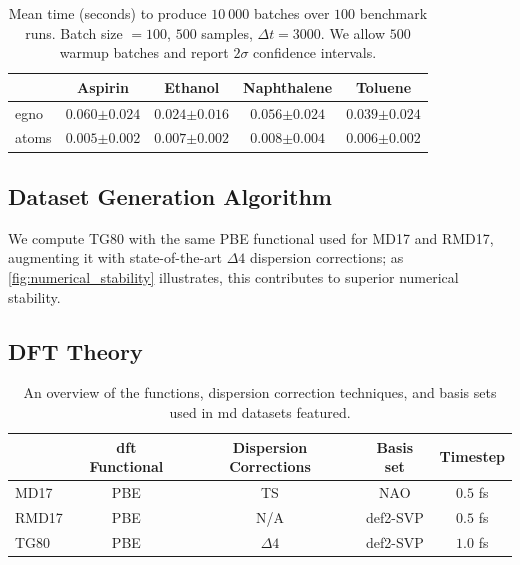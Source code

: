 \begin{table}[ht]
    \centering
    \caption{Mean time (seconds) to produce \(10\ 000\) batches over \(100\) benchmark runs. Batch size \(= 100\), \(500\) samples, \(\Delta t = 3000\). We allow \(500\) warmup batches and report \(2\sigma\) confidence intervals.}
    \label{tab:dataloader_perf}
    \begin{tabular}{lcccc}
        \toprule
         & Aspirin & Ethanol & Naphthalene & Toluene \\
         \midrule
         \gls{egno} & \(0.060{\scriptstyle \pm0.024}\) & \(0.024{\scriptstyle \pm0.016}\) & \(0.056{\scriptstyle \pm0.024}\) & \(0.039{\scriptstyle \pm0.024}\) \\
         \gls{atoms} & \(0.005{\scriptstyle \pm0.002}\) & \(0.007{\scriptstyle \pm0.002}\) & \(0.008{\scriptstyle \pm0.004}\) & \(0.006{\scriptstyle \pm0.002}\) \\
         \bottomrule
    \end{tabular}
\end{table}

\subsection{Dataset Generation Algorithm}
We compute TG80 with the same PBE functional used for MD17 and RMD17, augmenting it with state-of-the-art \(\Delta 4\) dispersion corrections; as \cref{fig:numerical_stability} illustrates, this contributes to superior numerical stability.

\subsection{DFT Theory}
\begin{table}[H]
    \centering
    \caption{An overview of the functions, dispersion correction techniques, and basis sets used in \gls{md} datasets featured.}
    \label{tab:dft_techniques}
    \begin{tabular}{lcccc}
        \toprule
        & \gls{dft} Functional & Dispersion Corrections & Basis set & Timestep \\
        \midrule
        MD17 \cite{chmiela_machine_2017} & PBE & TS & NAO & \(0.5\) fs \\
        RMD17 \cite{christensen_role_2020} & PBE & N/A & def2-SVP & \(0.5\) fs \\
        TG80 & PBE & \(\Delta 4\) & def2-SVP & \(1.0\) fs \\
        \bottomrule
    \end{tabular}
\end{table}

